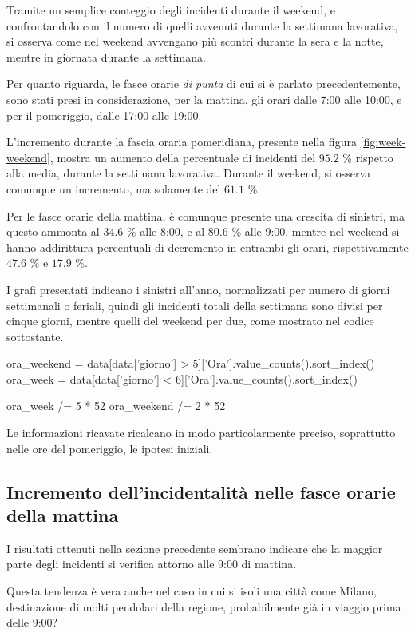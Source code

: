 \documentclass[a4paper,12pt]{report}
\newcommand{\quotestyle}[1]{\textit{#1}}
\begin{document}
Tramite un semplice conteggio degli incidenti durante il weekend, e 
confrontandolo con il numero di quelli avvenuti durante la 
settimana lavorativa, si osserva come nel weekend avvengano più scontri 
durante la sera e la notte, mentre in giornata durante la settimana. 

Per quanto riguarda, le fasce orarie \quotestyle{di punta} di cui si 
è parlato precedentemente, 
sono stati presi in considerazione, per la mattina, gli orari dalle 7:00 alle 10:00, 
e per il pomeriggio, dalle 17:00 alle 19:00. 

L'incremento durante la fascia oraria pomeridiana, presente nella figura 
\ref{fig:week-weekend}, mostra un aumento della percentuale di incidenti 
del $95.2$ \% rispetto alla media, durante la settimana lavorativa. 
Durante il weekend, si osserva comunque un incremento, ma solamente del $61.1$ \%. 

Per le fasce orarie della mattina, è comunque presente una crescita di sinistri, 
ma questo ammonta al $34.6$ \% alle 8:00, e al $80.6$ \% alle 9:00, 
mentre nel weekend si hanno addirittura percentuali di decremento 
in entrambi gli orari, rispettivamente $47.6$ \% e $17.9$ \%. 

I grafi presentati indicano i sinistri all'anno, normalizzati per numero di 
giorni settimanali o feriali, quindi gli incidenti totali della settimana sono divisi 
per cinque giorni, mentre quelli del weekend per due, 
come mostrato nel codice sottostante. 

\begin{code}[language=Python]
ora_weekend = data[data['giorno'] > 5]['Ora'].value_counts().sort_index()
ora_week = data[data['giorno'] < 6]['Ora'].value_counts().sort_index()

ora_week /= 5 * 52
ora_weekend /= 2 * 52
\end{code}

Le informazioni ricavate ricalcano in modo particolarmente preciso, 
soprattutto nelle ore del pomeriggio, le ipotesi iniziali. 

\subsection{Incremento dell'incidentalità nelle fasce orarie della mattina}

I risultati ottenuti nella sezione precedente sembrano indicare 
che la maggior parte degli incidenti si verifica attorno alle 9:00 di mattina. 

Questa tendenza è vera anche nel caso in cui si isoli una città come Milano, 
destinazione di molti pendolari della regione, probabilmente 
già in viaggio prima delle 9:00?
\end{document}
